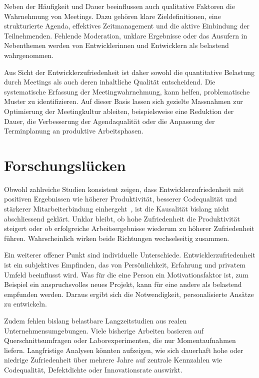 \documentclass[12pt,a4paper]{report}
\begin{document}
    Neben der Häufigkeit und Dauer beeinflussen auch qualitative Faktoren die Wahrnehmung von Meetings. Dazu gehören klare
    Zieldefinitionen, eine strukturierte Agenda, effektives Zeitmanagement und die aktive Einbindung der Teilnehmenden.
    Fehlende Moderation, unklare Ergebnisse oder das Ausufern in Nebenthemen werden von Entwicklerinnen und Entwicklern
    als belastend wahrgenommen.

    Aus Sicht der Entwicklerzufriedenheit ist daher sowohl die quantitative Belastung durch Meetings als auch deren
    inhaltliche Qualität entscheidend. Die systematische Erfassung der Meetingwahrnehmung, kann helfen, problematische
    Muster zu identifizieren. Auf dieser Basis lassen sich gezielte Massnahmen
    zur Optimierung der Meetingkultur ableiten, beispielsweise eine Reduktion der Dauer, die Verbesserung der Agendaqualität
    oder die Anpassung der Terminplanung an produktive Arbeitsphasen.


\section{Forschungslücken}

Obwohl zahlreiche Studien konsistent zeigen, dass Entwicklerzufriedenheit mit positiven Ergebnissen wie höherer Produktivität,
besserer Codequalität und stärkerer Mitarbeiterbindung einhergeht~\cite{graziotin_what_2018, sadowksi_happiness_2019}, ist die
Kausalität bislang nicht abschliessend geklärt. Unklar bleibt, ob hohe Zufriedenheit die Produktivität steigert oder ob
erfolgreiche Arbeitsergebnisse wiederum zu höherer Zufriedenheit führen. Wahrscheinlich wirken beide Richtungen wechselseitig
zusammen.

Ein weiterer offener Punkt sind individuelle Unterschiede. Entwicklerzufriedenheit ist ein subjektives Empfinden, das von
Persönlichkeit, Erfahrung und privatem Umfeld beeinflusst wird. Was für die eine Person ein Motivationsfaktor ist, zum Beispiel 
ein anspruchsvolles neues Projekt, kann für eine andere als belastend empfunden werden. Daraus ergibt sich die Notwendigkeit,
personalisierte Ansätze zu entwickeln.

Zudem fehlen bislang belastbare Langzeitstudien aus realen Unternehmensumgebungen. Viele bisherige Arbeiten basieren auf
Querschnittsumfragen oder Laborexperimenten, die nur Momentaufnahmen liefern. Langfristige Analysen könnten aufzeigen, wie sich
dauerhaft hohe oder niedrige Zufriedenheit über mehrere Jahre auf zentrale Kennzahlen wie Codequalität, Defektdichte oder
Innovationsrate auswirkt. 
\end{document}
